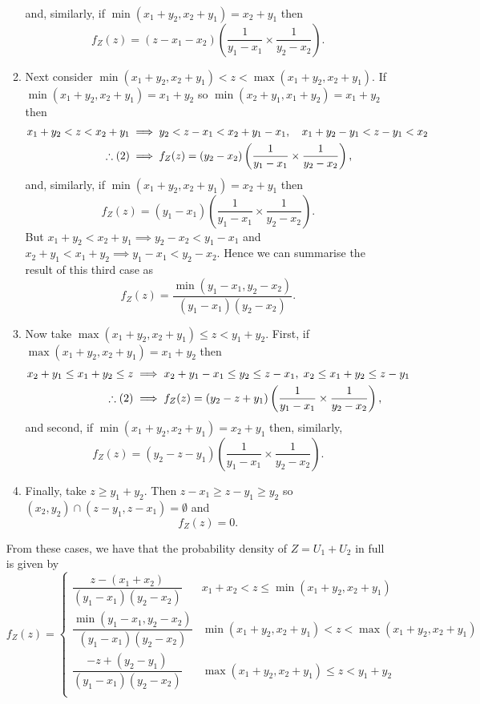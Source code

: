 \documentclass{article}
\begin{document}
\begin{enumerate}
\begin{enumerate}
\begin{align}
    \end{align}
    and, similarly, if $\min(x_1+y_2, x_2+y_1) = x_2+y_1$ then
    \[ f_Z(z) = (z-x_1-x_2)\left( \frac{1}{y_1 - x_1} \times \frac{1}{y_2 - x_2} \right). \]
    \item Next consider $\min(x_1 + y_2, x_2 + y_1) < z < \max(x_1 + y_2, x_2 + y_1)$. If $\min(x_1+y_2, x_2+y_1) = x_1+y_2$ so $\min(x_2+y_1, x_1+y_2) = x_1+y_2$ then
    \begin{align}
      x_1 + y_2 < z < x_2 + y_1 &\implies y_2 < z - x_1 < x_2 + y_1 - x_1, \quad x_1 + y_2 - y_1 < z - y_1 < x_2 \notag \\ 
      \therefore (2) &\implies f_Z(z) = (y_2 - x_2)\left( \frac{1}{y_1 - x_1} \times \frac{1}{y_2 - x_2} \right), \notag
    \end{align}
    and, similarly, if $\min(x_1+y_2, x_2+y_1) = x_2+y_1$ then \[f_Z(z)=(y_1 - x_1)\left( \frac{1}{y_1 - x_1} \times \frac{1}{y_2 - x_2} \right).\]
    But $x_1+y_2 < x_2+y_1 \implies y_2-x_2 < y_1-x_1$ and $x_2+y_1 < x_1+y_2 \implies y_1-x_1 < y_2-x_2$. Hence we can summarise the result of this third case as \[f_Z(z) = \frac{\min(y_1-x_1, y_2-x_2)}{(y_1-x_1)(y_2-x_2)}.\]
    \item Now take $\max(x_1+y_2, x_2+y_1) \leq z < y_1+y_2$. First, if $\max(x_1+y_2, x_2+y_1) = x_1+y_2$ then
    \begin{align}
      x_2+y_1 \leq x_1+y_2 \leq z &\implies x_2+y_1-x_1 \leq y_2 \leq z-x_1, \; x_2 \leq x_1+y_2 \leq z-y_1 \notag \\ 
      \therefore (2) &\implies f_Z(z) = (y_2 - z + y_1)\left( \frac{1}{y_1 - x_1} \times \frac{1}{y_2 - x_2} \right), \notag
    \end{align}
    and second, if $\min(x_1+y_2, x_2+y_1) = x_2+y_1$ then, similarly,
    \[ f_Z(z) = (y_2-z-y_1)\left( \frac{1}{y_1 - x_1} \times \frac{1}{y_2 - x_2} \right). \]
    \item Finally, take $z \geq y_1 + y_2$. Then $z-x_1 \geq z-y_1 \geq y_2$ so $(x_2, y_2) \cap (z-y_1, z-x_1) = \emptyset$ and \[f_Z(z) = 0.\]
  \end{enumerate}
  From these cases, we have that the probability density of $Z = U_1 + U_2$ in full is given by \[f_Z(z) =
  \begin{cases}
    \dfrac{z-(x_1+x_2)}{(y_1 - x_1)(y_2-x_2)} & x_1+x_2 < z \leq \min(x_1+y_2,x_2+y_1) \\
    \dfrac{\min(y_1-x_1, y_2-x_2)}{(y_1 - x_1)(y_2-x_2)} & \min(x_1+y_2, x_2+y_1) < z < \max(x_1+y_2, x_2+y_1) \\
    \dfrac{-z+(y_2-y_1)}{(y_1 - x_1)(y_2-x_2)} & \max(x_1+y_2, x_2+y_1) \leq z < y_1 + y_2 \\

\end{cases}\]
\end{enumerate}
\end{document}

